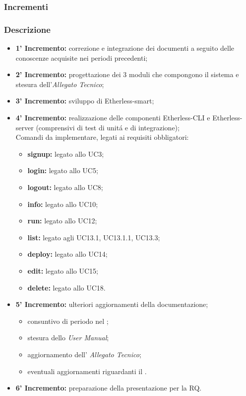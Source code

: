 	\subsubsection{Incrementi}
		\subsubsection{Descrizione}
			\begin{itemize}
				\item \textbf{1' Incremento:} correzione e integrazione dei documenti a seguito delle conoscenze acquisite nei periodi precedenti;
				\item \textbf{2' Incremento:} progettazione dei 3 moduli che compongono il sistema e stesura dell'\textit{Allegato Tecnico};
				\item \textbf{3' Incremento:} sviluppo di Etherless-smart;
				\item \textbf{4' Incremento:} realizzazione delle componenti Etherless-CLI e Etherless-server (comprensivi di test di unitá e di integrazione);\\
				Comandi da implementare, legati ai requisiti obbligatori:
					\begin{itemize}
						\item \textbf{signup:} legato allo UC3;
						\item \textbf{login:} legato allo UC5;
						\item \textbf{logout:} legato allo UC8;
						\item \textbf{info:} legato allo UC10;
						\item \textbf{run:} legato allo UC12;
						\item \textbf{list:} legato agli UC13.1, UC13.1.1, UC13.3;
						\item \textbf{deploy:} legato allo UC14;
						\item \textbf{edit:} legato allo UC15;
						\item \textbf{delete:} legato allo UC18.
					\end{itemize}
				\item \textbf{5' Incremento:} ulteriori aggiornamenti della documentazione;%
					\begin{itemize}
						\item consuntivo di periodo nel \PdP{};
						\item stesura dello \textit{User Manual};
						\item aggiornamento dell' \textit{Allegato Tecnico};
						\item eventuali aggiornamenti riguardanti il \Glossario{}.
					\end{itemize}
				\item \textbf{6' Incremento:} preparazione della presentazione per la RQ.
			\end{itemize}
